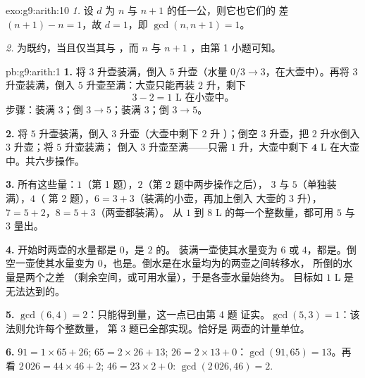 \begin{solution}{exo:g9:arith:10}
\emph{1.} 设 $d$ 为 $n$ 与 $n+1$ 的任一公，则它也它们的
差 $(n+1) - n = 1$，故 $d = 1$，即 $\gcd(n, n+1) = 1$。

\emph{2.} 为既约，当且仅当其与
，而 $n$ 与 $n + 1$ ，由第
1 小题可知。
\end{solution}

\begin{solution}{pb:g9:arith:1}
\textbf{1.} 将 $3$ 升壶装满，倒入 $5$ 升壶（水量
$0/3 \to 3$，在大壶中）。再将 $3$ 升壶装满，倒入
$5$ 升壶至满：大壶只能再装 $2$ 升，剩下
\[
3 - 2 = 1 \text{ L 在小壶中。}
\]
步骤：装满 $3$；倒 $3 \to 5$；装满 $3$；倒 $3 \to 5$。

\textbf{2.} 将 $5$ 升壶装满，倒入 $3$ 升壶（大壶中剩下 $2$ 升
）；倒空 $3$ 升壶，把 $2$ 升水倒入 $3$ 升壶；将 $5$ 升壶装满；
倒入 $3$ 升壶至满——只需 $1$ 升，大壶中剩下
$\mathbf{4}$ L 在大壶中。共六步操作。

\textbf{3.} 所有这些量：$1$（第 1 题），$2$（第 2 题中两步操作之后），
$3$ 与 $5$（单独装满），$4$（
第 2 题），$6 = 3 + 3$（装满的小壶，再加上倒入
大壶的 $3$ 升），$7 = 5 + 2$，$8 = 5 + 3$（两壶都装满）。
从 $1$ 到 $8$ L 的每一个整数量，都可用 $5$ 与 $3$ 量出。

\textbf{4.} 开始时两壶的水量都是 $0$，是 $2$ 的。
装满一壶使其水量变为 $6$ 或 $4$，都是。倒空一壶使其水量变为
$0$，也是。倒水是在水量均为的两壶之间转移水，
所倒的水量是两个之差
（剩余空间，或可用水量），于是各壶水量始终为。
目标如 $1$ L 是无法达到的。

\textbf{5.} $\gcd(6, 4) = 2$：只能得到量，这一点已由第 4 题
证实。$\gcd(5, 3) = 1$：该法则允许每个整数量，
第 3 题已全部实现。恰好是
两壶的计量单位。

\textbf{6.} $91 = 1 \times 65 + 26$; $65 = 2 \times 26 + 13$;
$26 = 2 \times 13 + 0$：$\gcd(91, 65) = 13$。再看
$2\,026 = 44 \times 46 + 2$; $46 = 23 \times 2 + 0$:
$\gcd(2\,026, 46) = 2$.


\end{solution}
